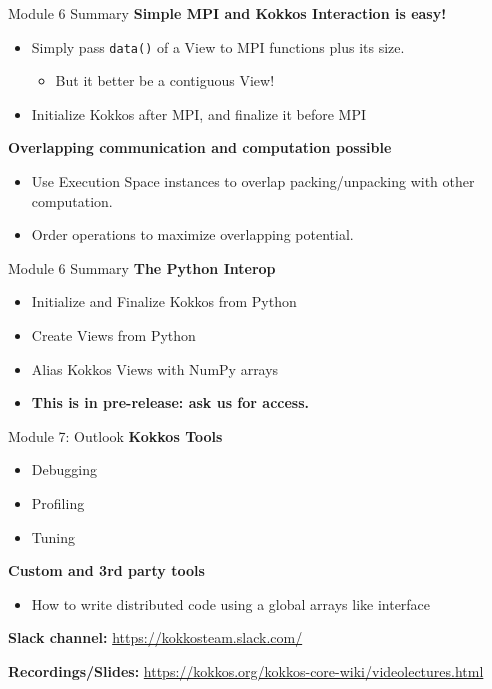 



\begin{frame}{Module 6 Summary}
\textbf{Simple MPI and Kokkos Interaction is easy!}
\begin{itemize}
  \item Simply pass \texttt{data()} of a View to MPI functions plus its size.
  \begin{itemize}
    \item But it better be a contiguous View!
  \end{itemize}
  \item Initialize Kokkos after MPI, and finalize it before MPI
\end{itemize}

\vspace{10pt}
\textbf{Overlapping communication and computation possible}
\begin{itemize}
  \item Use Execution Space instances to overlap packing/unpacking with other computation.
  \item Order operations to maximize overlapping potential. 
\end{itemize}
\end{frame}

\begin{frame}[fragile]{Module 6 Summary}
  \textbf{The Python Interop}
  \begin{itemize}
    \item Initialize and Finalize Kokkos from Python
    \item Create Views from Python
    \item Alias Kokkos Views with NumPy arrays
    \item \textbf{This is in pre-release: ask us for access.}
  \end{itemize}
\end{frame}

\begin{frame}{Module 7: Outlook}
	\textbf{Kokkos Tools}
	\begin{itemize}
		\item {Debugging}
		\item {Profiling}
                \item {Tuning}
	\end{itemize}

	\vspace{5pt}
	\textbf{Custom and 3rd party tools}
	\begin{itemize}
		\item {How to write distributed code using a global arrays like interface}
	\end{itemize}

	\vspace{10pt}
    \textbf{Slack channel:} {\scriptsize \url{https://kokkosteam.slack.com/}}
	
	\vspace{10pt}
	\textbf{Recordings/Slides:} {\scriptsize \url{https://kokkos.org/kokkos-core-wiki/videolectures.html}}

\end{frame}





